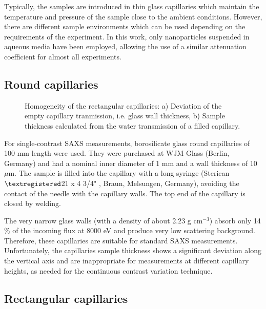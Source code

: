 Typically, the samples are introduced in thin glass capillaries which maintain the temperature and pressure of the sample close to the ambient conditions. However, there are different sample environments which can be used depending on the requirements of the experiment. In this work, only nanoparticles suspended in aqueous media have been employed, allowing the use of a similar attenuation coefficient for almost all experiments.

\subsection{Round capillaries}

\begin{figure}%
	\centering
		\caption[Homogeneity of the rectangular capillaries.]{Homogeneity of the rectangular capillaries: a) Deviation of the empty capillary tranmission, i.e. glass wall thickness, b) Sample thickness calculated from the water transmission of a filled capillary. }
\end{figure}

For single-contrast SAXS measurements, borosilicate glass round capillaries of 100 mm length were used. They were purchased at WJM Glass (Berlin, Germany) and had a nominal inner diameter of 1 mm and a wall thickness of 10 $\mu$m. The sample is filled into the capillary with a long syringe (Sterican$\textregistered$21 x 4 3/4" , Braun, Melsungen, Germany), avoiding the contact of the needle with the capillary walls. The top end of the capillary is closed by welding.

The very narrow glass walls (with a density of about 2.23 g cm$^{-3}$) absorb only 14 $\%$ of the incoming flux at 8000 eV and produce very low scattering background. Therefore, these capillaries are suitable for standard SAXS measurements. Unfortunately, the capillaries sample thickness shows a significant deviation along the vertical axis and are inappropriate for measurements at different capillary heights, as needed for the continuous contrast variation technique.

\subsection{Rectangular capillaries}

